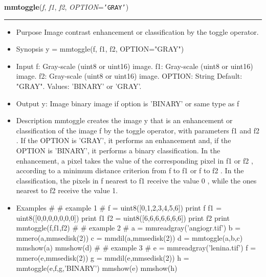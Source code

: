     \begin{boxedminipage}{\textwidth}

    \raggedright \textbf{mmtoggle}(\textit{f}, \textit{f1}, \textit{f2}, \textit{OPTION}=\texttt{'\-G\-R\-A\-Y\-'\-})

    \vspace{-1.5ex}

    \rule{\textwidth}{0.5\fboxrule}
    \begin{itemize}
    \setlength{\parskip}{0.6ex}
      \item Purpose Image contrast enhancement or classification by the 
        toggle operator.

      \item Synopsis y = mmtoggle(f, f1, f2, OPTION="GRAY")

      \item Input f: Gray-scale (uint8 or uint16) image. f1: Gray-scale 
        (uint8 or uint16) image. f2: Gray-scale (uint8 or uint16) image. 
        OPTION: String Default: "GRAY". Values: 'BINARY' or 'GRAY'.

      \item Output y: Image binary image if option is 'BINARY' or same type 
        as f

      \item Description mmtoggle creates the image y that is an enhancement 
        or classification of the image f by the toggle operator, with 
        parameters f1 and f2 . If the OPTION is 'GRAY', it performs an 
        enhancement and, if the OPTION is 'BINARY', it performs a binary 
        classification. In the enhancement, a pixel takes the value of 
        the corresponding pixel in f1 or f2 , according to a minimum 
        distance criterion from f to f1 or f to f2 . In the 
        classification, the pixels in f nearest to f1 receive the value 0 
        , while the ones nearest to f2 receive the value 1.

      \item Examples \# \# example 1 \# f = uint8([0,1,2,3,4,5,6]) print f f1 
        = uint8([0,0,0,0,0,0,0]) print f1 f2 = uint8([6,6,6,6,6,6,6]) 
        print f2 print mmtoggle(f,f1,f2) \# \# example 2 \# a = 
        mmreadgray('angiogr.tif') b = mmero(a,mmsedisk(2)) c = 
        mmdil(a,mmsedisk(2)) d = mmtoggle(a,b,c) mmshow(a) mmshow(d) \# 
        \# example 3 \# e = mmreadgray('lenina.tif') f = 
        mmero(e,mmsedisk(2)) g = mmdil(e,mmsedisk(2)) h = 
        mmtoggle(e,f,g,'BINARY') mmshow(e) mmshow(h)

    \end{itemize}

    \vspace{1ex}

    \end{boxedminipage}

